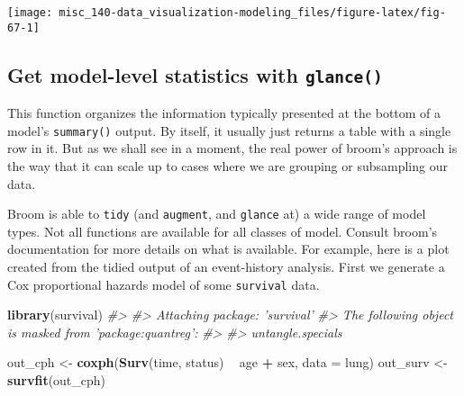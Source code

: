 \documentclass[]{book}
\newenvironment{Shaded}{\begin{snugshade}}{\end{snugshade}}
\newcommand{\CommentTok}[1]{\textcolor[rgb]{0.56,0.35,0.01}{\textit{#1}}}
\newcommand{\DataTypeTok}[1]{\textcolor[rgb]{0.13,0.29,0.53}{#1}}
\newcommand{\KeywordTok}[1]{\textcolor[rgb]{0.13,0.29,0.53}{\textbf{#1}}}
\newcommand{\NormalTok}[1]{#1}
\newcommand{\OperatorTok}[1]{\textcolor[rgb]{0.81,0.36,0.00}{\textbf{#1}}}
\newcommand{\StringTok}[1]{\textcolor[rgb]{0.31,0.60,0.02}{#1}}
\begin{document}
\begin{center}\texttt{[image: misc\_140-data\_visualization-modeling\_files/figure-latex/fig-67-1]} \end{center}

\hypertarget{get-model-level-statistics-with-glance}{%
\subsection{\texorpdfstring{Get model-level statistics with \texttt{glance()}}{Get model-level statistics with glance()}}\label{get-model-level-statistics-with-glance}}

This function organizes the information typically presented at the bottom of a model's \texttt{summary()} output. By itself, it usually just returns a table with a single row in it. But as we shall see in a moment, the real power of broom's approach is the way that it can scale up to cases where we are grouping or subsampling our data.

\begin{Shaded}
\end{Shaded}

Broom is able to \texttt{tidy} (and \texttt{augment}, and \texttt{glance} at) a wide range of model types. Not all functions are available for all classes of model. Consult broom's documentation for more details on what is available. For example, here is a plot created from the tidied output of an event-history analysis. First we generate a Cox proportional hazards model of some \texttt{survival} data.

\begin{Shaded}
\begin{Highlighting}[]
\KeywordTok{library}\NormalTok{(survival)}
\CommentTok{#> }
\CommentTok{#> Attaching package: 'survival'}
\CommentTok{#> The following object is masked from 'package:quantreg':}
\CommentTok{#> }
\CommentTok{#>     untangle.specials}

\NormalTok{out_cph <-}\StringTok{ }\KeywordTok{coxph}\NormalTok{(}\KeywordTok{Surv}\NormalTok{(time, status) }\OperatorTok{~}\StringTok{ }\NormalTok{age }\OperatorTok{+}\StringTok{ }\NormalTok{sex, }\DataTypeTok{data =}\NormalTok{ lung)}
\NormalTok{out_surv <-}\StringTok{ }\KeywordTok{survfit}\NormalTok{(out_cph)}
\end{Highlighting}
\end{Shaded}
\end{document}
